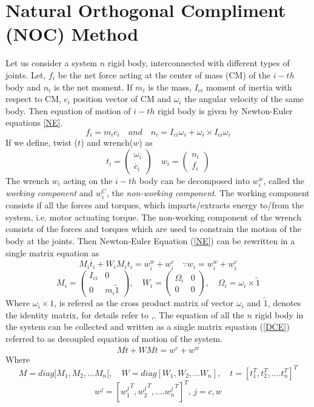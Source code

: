 \section{Natural Orthogonal Compliment (NOC) Method}
Let us consider a system $n$ rigid body, interconnected with different types of joints. Let, $f_i$ be the net force acting at the center of mass (CM) of the $i-th$  body and $n_i$ is the net moment. If $m_i$ is the mass, $I_{ci}$ moment of inertia with respect to  CM, $c_i$ position vector of CM and $\omega_i$ the angular velocity of the same body. Then equation of motion of $i-th$ rigid body is given by Newton-Euler equations \ref{NE}. 
\begin{equation}
\label{NE}
f_i=m_i\ddot{c_i} \quad and \quad n_i=I_{ci} \omega_i+\omega_i \times I_{ci} \omega_i
\end{equation}
If we define, twist ($t$) and wrench($w$) as 
\begin{equation*}
t_i=\begin{pmatrix}
\omega_i\\ \dot{c_i}
\end{pmatrix} \quad
w_i=\begin{pmatrix}
n_i\\f_i
\end{pmatrix}
\end{equation*}
The wrench $w_i$ acting on the $i-th$ body can be decomposed into $w^w_i$, called the \textit{working component} and  $w^C_i$, the \textit{non-working component}. The working component consists if all the forces and torques, which imparts/extracts energy to/from the system, i.e. motor actuating torque. The non-working component of the wrench consists of the forces and torques which are used to constrain the motion of the body at the joints.
Then Newton-Euler Equation (\ref{NE}) can be rewritten  in a single matrix equation as 
\begin{equation}
\label{2}
M_i\dot{t_i}+W_iM_it_i=w^w_i+w^c_i \quad \because w_i=w^w_i+w^c_i
\end{equation}
\begin{equation}
\label{3}
M_i=\begin{pmatrix}
I_{ci} & 0\\0 & m_i\tilde{1}
\end{pmatrix} ,
\quad W_i=\begin{pmatrix}
\Omega_i &0\\0&0
\end{pmatrix},
\quad
\Omega_i=\omega_i\times \tilde{1}
\end{equation}
Where $\omega_i\times 1$, is refered as the cross product matrix of vector $\omega_i$ and $\tilde{1}$, denotes the identity matrix, for details refer to \cite{angeles2013fundamentals},\cite{saha2010robotics}.
The equation of all the $n$ rigid body in the system can be collected and written as a single matrix equation (\ref{DCE}) referred to as  decoupled equation of motion of the system. 
\begin{equation}
\label{DCE}
M\dot{t}+WMt=w^c+w^w
\end{equation}
Where
\[M=diag[M_1,M_2,...M_n[, \quad W=diag[W_1,W_2,...W_n], \quad t=[t_1^T,t_2^T, ....t_n^T]^T\]
\[ w^j=[{w_1^j}^T,{w_2^j}^T, ....{w_n^j}^T]^T, \,j=c,w \]

